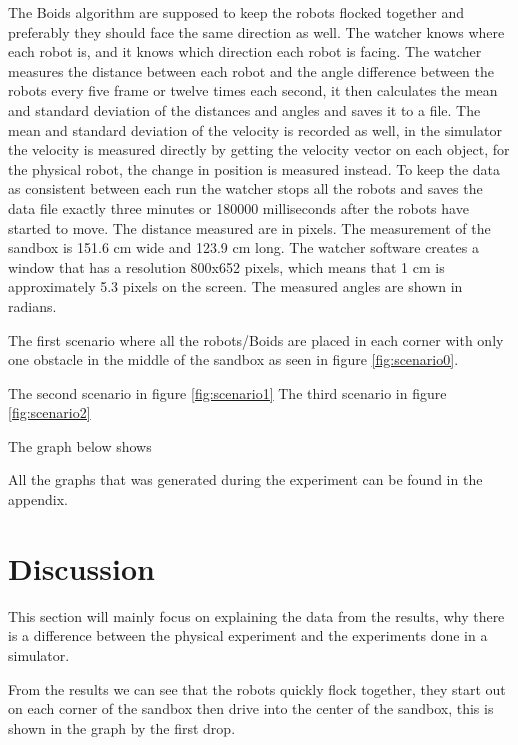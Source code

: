 The Boids algorithm are supposed to keep the robots flocked together and preferably they should face the same direction as well. The watcher knows where each robot is, and it knows which direction each robot is facing. The watcher measures the distance between each robot and the angle difference between the robots every five frame or twelve times each second, it then calculates the mean and standard deviation of the distances and angles and saves it to a file. The mean and standard deviation of the velocity is recorded as well, in the simulator the velocity is measured directly by getting the velocity vector on each object, for the physical robot, the change in position is measured instead.
To keep the data as consistent between each run the watcher stops all the robots and saves the data file exactly three minutes or 180000 milliseconds after the robots have started to move.
The distance measured are in pixels. The measurement of the sandbox is 151.6 cm wide and 123.9 cm long. The watcher software creates a window that has a resolution 800x652 pixels, which means that 1 cm is approximately 5.3 pixels on the screen. The measured angles are shown in radians.

The first scenario where all the robots/Boids are placed in each corner with only one obstacle in the middle of the sandbox as seen in figure \ref{fig:scenario0}. 

The second scenario in figure \ref{fig:scenario1}
The third scenario in figure \ref{fig:scenario2}

The graph below shows

All the graphs that was generated during the experiment can be found in the appendix.
\section{Discussion}
\label{sec:discussion}
This section will mainly focus on explaining the data from the results, why there is a difference between the physical experiment and the experiments done in a simulator. 

From the results we can see that the robots quickly flock together, they start out on each corner of the sandbox then drive into the center of the sandbox, this is shown in the graph by the first drop. 

